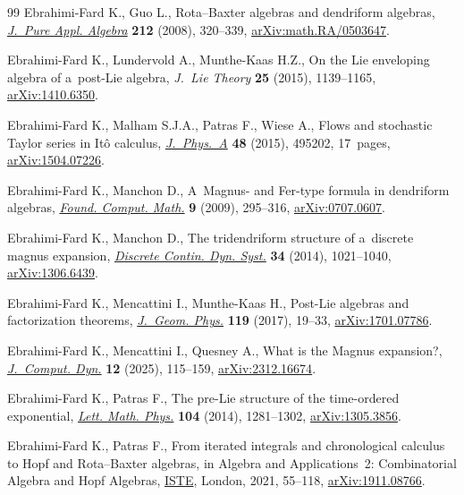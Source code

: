 \begin{thebibliography}{99}
Ebrahimi-Fard K., Guo L., Rota--{B}axter algebras and dendriform algebras,
 \href{https://doi.org/10.1016/j.jpaa.2007.05.025}{\textit{J.~Pure Appl.
 Algebra}} \textbf{212} (2008), 320--339,
 \href{http://arxiv.org/abs/math.RA/0503647}{arXiv:math.RA/0503647}.

Ebrahimi-Fard K., Lundervold A., Munthe-Kaas H.Z., On the {L}ie enveloping
 algebra of a~post-{L}ie algebra, \textit{J.~Lie Theory} \textbf{25} (2015),
 1139--1165, \href{http://arxiv.org/abs/1410.6350}{arXiv:1410.6350}.

Ebrahimi-Fard K., Malham S.J.A., Patras F., Wiese A., Flows and stochastic
 {T}aylor series in {I}t\^o calculus,
 \href{https://doi.org/10.1088/1751-8113/48/49/495202}{\textit{J.~Phys.~A}}
 \textbf{48} (2015), 495202, 17~pages,
 \href{http://arxiv.org/abs/1504.07226}{arXiv:1504.07226}.

Ebrahimi-Fard K., Manchon D., A~{M}agnus- and {F}er-type formula in dendriform
 algebras, \href{https://doi.org/10.1007/s10208-008-9023-3}{\textit{Found.
 Comput. Math.}} \textbf{9} (2009), 295--316,
 \href{http://arxiv.org/abs/0707.0607}{arXiv:0707.0607}.

Ebrahimi-Fard K., Manchon D., The tridendriform structure of a~discrete magnus
 expansion, \href{https://doi.org/10.3934/dcds.2014.34.1021}{\textit{Discrete
 Contin. Dyn. Syst.}} \textbf{34} (2014), 1021--1040,
 \href{http://arxiv.org/abs/1306.6439}{arXiv:1306.6439}.

Ebrahimi-Fard K., Mencattini I., Munthe-Kaas H., Post-{L}ie algebras and
 factorization theorems,
 \href{https://doi.org/10.1016/j.geomphys.2017.04.007}{\textit{J.~Geom.
 Phys.}} \textbf{119} (2017), 19--33,
 \href{http://arxiv.org/abs/1701.07786}{arXiv:1701.07786}.

Ebrahimi-Fard K., Mencattini I., Quesney A., What is the {M}agnus expansion?,
 \href{https://doi.org/10.3934/jcd.2024028}{\textit{J.~Comput. Dyn.}}
 \textbf{12} (2025), 115--159,
 \href{http://arxiv.org/abs/2312.16674}{arXiv:2312.16674}.

Ebrahimi-Fard K., Patras F., The pre-{L}ie structure of the time-ordered
 exponential, \href{https://doi.org/10.1007/s11005-014-0703-4}{\textit{Lett.
 Math. Phys.}} \textbf{104} (2014), 1281--1302,
 \href{http://arxiv.org/abs/1305.3856}{arXiv:1305.3856}.

Ebrahimi-Fard K., Patras F., From iterated integrals and chronological calculus
 to {H}opf and {R}ota--{B}axter algebras, in Algebra and Applications~2:
 Combinatorial Algebra and {H}opf Algebras,
 \href{https://doi.org/10.1002/9781119880912.ch2}{ISTE}, London, 2021,
 55--118, \href{http://arxiv.org/abs/1911.08766}{arXiv:1911.08766}.


\end{thebibliography}
